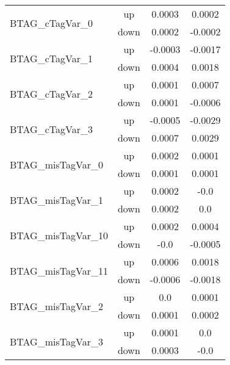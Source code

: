 \begin{table}[h!]
\begin{tabular}{lccc}
\multirow{2}{*}{BTAG\_cTagVar\_0}      & up   &      0.0003     &     0.0002      \\
                                       & down &          0.0002     &     -0.0002       \\ \hline
\multirow{2}{*}{BTAG\_cTagVar\_1}      & up   &        -0.0003     &     -0.0017      \\
                                       & down &          0.0004     &     0.0018       \\ \hline
\multirow{2}{*}{BTAG\_cTagVar\_2}      & up   &          0.0001     &     0.0007      \\
                                       & down &         0.0001     &     -0.0006       \\ \hline
\multirow{2}{*}{BTAG\_cTagVar\_3}      & up   &         -0.0005     &     -0.0029      \\
                                       & down &         0.0007     &     0.0029       \\ \hline
\multirow{2}{*}{BTAG\_misTagVar\_0}      & up   &        0.0002     &     0.0001      \\
                                       & down &          0.0001     &     0.0001       \\ \hline
\multirow{2}{*}{BTAG\_misTagVar\_1}      & up   &        0.0002     &     -0.0      \\
                                       & down &          0.0002     &     0.0       \\ \hline
\multirow{2}{*}{BTAG\_misTagVar\_10}      & up   &       0.0002     &     0.0004      \\
                                       & down &          -0.0     &     -0.0005       \\ \hline
\multirow{2}{*}{BTAG\_misTagVar\_11}      & up   &       0.0006     &     0.0018      \\
                                       & down &         -0.0006     &     -0.0018       \\ \hline
\multirow{2}{*}{BTAG\_misTagVar\_2}      & up   &       0.0     &     0.0001      \\
                                       & down &         0.0001     &     0.0002       \\ \hline
\multirow{2}{*}{BTAG\_misTagVar\_3}      & up   &        0.0001     &     0.0      \\
                                       & down &          0.0003     &     -0.0       \\ \hline

\end{tabular}
\end{table}
